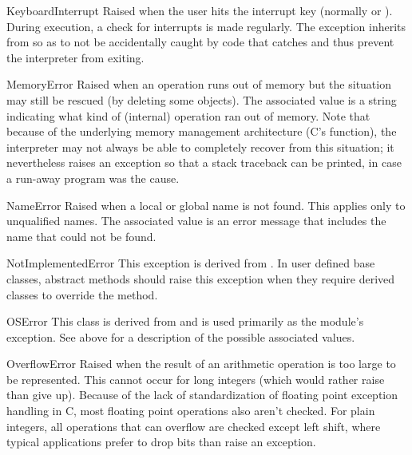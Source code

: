 \begin{excdesc}{KeyboardInterrupt}
  Raised when the user hits the interrupt key (normally
   or ).  During execution, a check for
  interrupts is made regularly.
  The exception inherits from  so as to not be
  accidentally caught by code that catches  and thus
  prevent the interpreter from exiting.
\end{excdesc}

\begin{excdesc}{MemoryError}
  Raised when an operation runs out of memory but the situation may
  still be rescued (by deleting some objects).  The associated value is
  a string indicating what kind of (internal) operation ran out of memory.
  Note that because of the underlying memory management architecture
  (C's  function), the interpreter may not
  always be able to completely recover from this situation; it
  nevertheless raises an exception so that a stack traceback can be
  printed, in case a run-away program was the cause.
\end{excdesc}

\begin{excdesc}{NameError}
  Raised when a local or global name is not found.  This applies only
  to unqualified names.  The associated value is an error message that
  includes the name that could not be found.
\end{excdesc}

\begin{excdesc}{NotImplementedError}
  This exception is derived from .  In user
  defined base classes, abstract methods should raise this exception
  when they require derived classes to override the method.
\end{excdesc}

\begin{excdesc}{OSError}
  This class is derived from  and is used
  primarily as the  module's  exception.
  See  above for a description of the
  possible associated values.
\end{excdesc}

\begin{excdesc}{OverflowError}
  Raised when the result of an arithmetic operation is too large to be
  represented.  This cannot occur for long integers (which would rather
  raise  than give up).  Because of the lack of
  standardization of floating point exception handling in C, most
  floating point operations also aren't checked.  For plain integers,
  all operations that can overflow are checked except left shift, where
  typical applications prefer to drop bits than raise an exception.
\end{excdesc}

